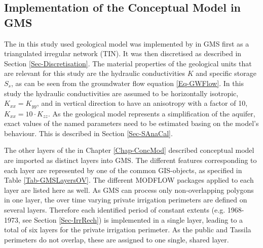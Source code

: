 
\subsection{Implementation of the Conceptual Model in GMS}
\label{Sec-ImplToGMS}

The in this study used geological model was implemented by \textcite{Horn.2021} in GMS first as a triangulated irregular network (TIN). 
It was then discretised as described in Section \ref{Sec-Discretisation}. 
The material properties of the geological units that are relevant for this study are the hydraulic conductivities $K$ and specific storage $S_s$, as can be seen from the groundwater flow equation \eqref{Eq-GWFlow}. 
In this study the hydraulic conductivities are assumed to be horizontally isotropic, $K_{xx} = K_{yy}$, and in vertical direction to have an anisotropy with a factor of 10, $K_{xx} = 10 \cdot K_{zz}$. 
As the geological model represents a simplification of the aquifer, exact values of the named parameters need to be estimated basing on the model's behaviour. 
This is described in Section \ref{Sec-SAnaCal}.

The other layers of the in Chapter \ref{Chap-ConcMod} described conceptual model are imported as distinct layers into GMS. 
The different features corresponding to each layer are represented by one of the common GIS-objects, as specified in Table \ref{Tab-GMSLayersOV}. 
The different MODFLOW packages applied to each layer are listed here as well. 
As GMS can process only non-overlapping polygons in one layer, the over time varying private irrigation perimeters are defined on several layers. 
Therefore each identified period of constant extents (e.g. 1968-1973, see Section \ref{Sec-IrrRech}) is implemented in a single layer, leading to a total of six layers for the private irrigation perimeter. 
As the public and Tassila perimeters do not overlap, these are assigned to one single, shared layer.

